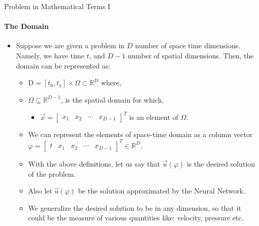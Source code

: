 \documentclass{beamer}
\begin{document}
\begin{frame}{Problem in Mathematical Terms I}
\framesubtitle{The Domain}

\begin{itemize}
    \item Suppose we are given a problem in $D$ number of space time dimensions. Namely, we have time $t$, and $D-1$ number of spatial dimensions. Then, the domain can be represented as:
    \begin{itemize}
        \item $\mathrm{D} = [t_0, t_1] \times \Omega \subset \mathbb{R}^D$ where,
        \item $\Omega \subseteq \mathbb{R}^{D-1}$, is the spatial domain for which,
        \begin{itemize}
            \item $\vec{x} = \begin{bmatrix} x_1 & x_2 & \cdots & x_{D-1}\end{bmatrix}^T$ is an element of $\Omega$.
        \end{itemize}
    \item We can represent the elements of space-time domain as a column vector $\varphi = \begin{bmatrix} t & x_1 & x_2 & \cdots & x_{D-1}\end{bmatrix}^T \in \mathbb{R}^D$.
    \item With the above definitions, let us say that $\vec{u}(\varphi)$ is the desired solution of the problem.
    \item Also let $\hat{u}(\varphi)$ be the solution approximated by the Neural Network.
    \item We generalize the desired solution to be in any dimension, so that it could be the measure of various quantities like; velocity, pressure etc.
    \end{itemize}
\end{itemize}

\end{frame}
\end{document}
